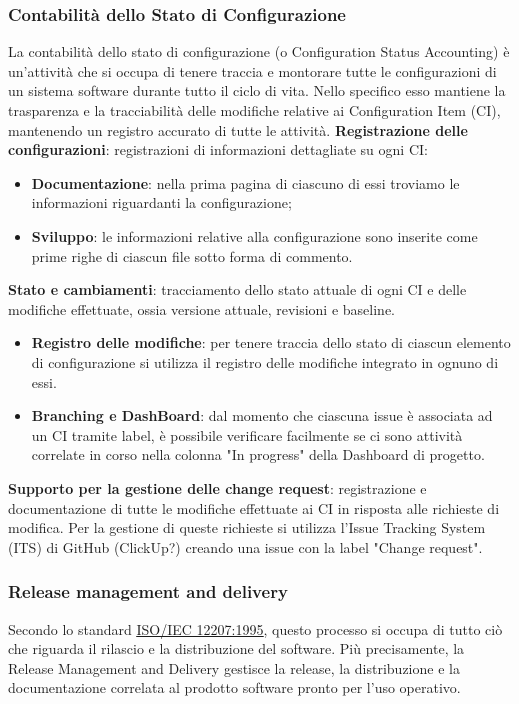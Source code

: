 \subsubsection{Contabilità dello Stato di Configurazione}
La contabilità dello stato di configurazione (o Configuration Status Accounting) è un'attività
che si occupa di tenere traccia e montorare tutte le configurazioni di un sistema software
durante tutto il ciclo di vita. Nello specifico esso mantiene la trasparenza e la tracciabilità delle modifiche relative ai Configuration Item (CI),
mantenendo un registro accurato di tutte le attività.
\textbf{Registrazione delle configurazioni}: registrazioni di informazioni dettagliate su ogni CI:
\begin{itemize}
	\item \textbf{Documentazione}: nella prima pagina di ciascuno di essi troviamo le informazioni riguardanti la configurazione;
	\item \textbf{Sviluppo}: le informazioni relative alla configurazione sono inserite come prime
	      righe di ciascun file sotto forma di commento.
\end{itemize}
\textbf{Stato e cambiamenti}: tracciamento dello stato attuale di ogni CI e delle modifiche effettuate, ossia versione attuale, revisioni e baseline.
\begin{itemize}
	\item \textbf{Registro delle modifiche}: per tenere traccia dello stato di ciascun elemento di configurazione si utilizza il registro
	      delle modifiche integrato in ognuno di essi.
	\item \textbf{Branching e DashBoard}: dal momento che ciascuna issue è associata ad un CI tramite
	      label, è possibile verificare facilmente se ci sono attività correlate
	      in corso nella colonna "In progress" della Dashboard di progetto.
\end{itemize}
\textbf{Supporto per la gestione delle change request}: registrazione e documentazione di tutte le modifiche effettuate ai CI in risposta alle
richieste di modifica. Per la gestione di queste richieste si utilizza l'Issue Tracking System (ITS) di GitHub (ClickUp?) creando una
issue con la label "Change request".

\subsubsection{Release management and delivery}
Secondo lo standard \href{https://www.math.unipd.it/~tullio/IS-1/2009/Approfondimenti/ISO_12207-1995.pdf}{\underline{ISO/IEC 12207:1995}},
questo processo si occupa di tutto ciò che riguarda il rilascio e la distribuzione del software. Più precisamente,
la Release Management and Delivery gestisce la release, la distribuzione e la documentazione correlata al prodotto software
pronto per l'uso operativo.

